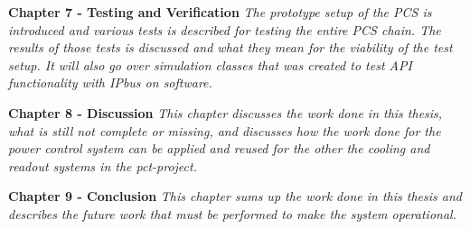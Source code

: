 \documentclass[main.tex]{subfiles}
\begin{document}
\textbf{Chapter 7 - Testing and Verification} \textit{The prototype setup of the PCS is introduced and various tests is described for testing the entire PCS chain. The results of those tests is discussed and what they mean for the viability of the test setup. It will also go over simulation classes that was created to test API functionality with IPbus on software.}

\textbf{Chapter 8 - Discussion} \textit{This chapter discusses the work done in this thesis, what is still not complete or missing, and discusses how the work done for the power control system can be applied and reused for the other the cooling and readout systems in the \gls{pct}-project.}

\textbf{Chapter 9 - Conclusion} \textit{This chapter sums up the work done in this thesis and describes the future work that must be performed to make the system operational.}
\end{document}
